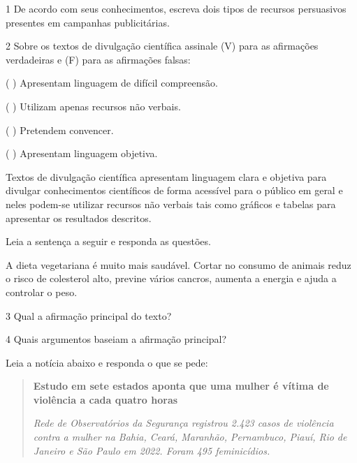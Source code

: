 {

\num{1} De acordo com seus conhecimentos, escreva dois tipos de recursos persuasivos 
presentes em campanhas publicitárias.


\num{2} Sobre os textos de divulgação científica assinale (V) para as afirmações verdadeiras e (F) para as afirmações falsas:

( ) Apresentam linguagem de difícil compreensão.

( ) Utilizam apenas recursos não verbais.

( ) Pretendem convencer.

( ) Apresentam linguagem objetiva.


Textos de divulgação científica apresentam linguagem clara e objetiva
para divulgar conhecimentos científicos de forma acessível para o
público em geral e neles podem-se utilizar recursos não verbais tais como gráficos
e tabelas para apresentar os resultados descritos.

Leia a sentença a seguir e responda as questões. 

A dieta vegetariana é muito mais saudável. Cortar no consumo de animais reduz
o risco de colesterol alto, previne vários cancros, aumenta a energia e ajuda a
controlar o peso.

\num{3} Qual a afirmação principal do texto?


\num{4} Quais argumentos baseiam a afirmação principal?


Leia a notícia abaixo e responda o que se pede:

\begin{quote}

\textbf{Estudo em sete estados aponta que uma mulher é vítima de
violência a cada quatro horas}

\emph{Rede de Observatórios da Segurança registrou 2.423 casos de
violência contra a mulher na Bahia, Ceará, Maranhão, Pernambuco, Piauí,
Rio de Janeiro e São Paulo em 2022. Foram 495 feminicídios.}


\end{quote}}
